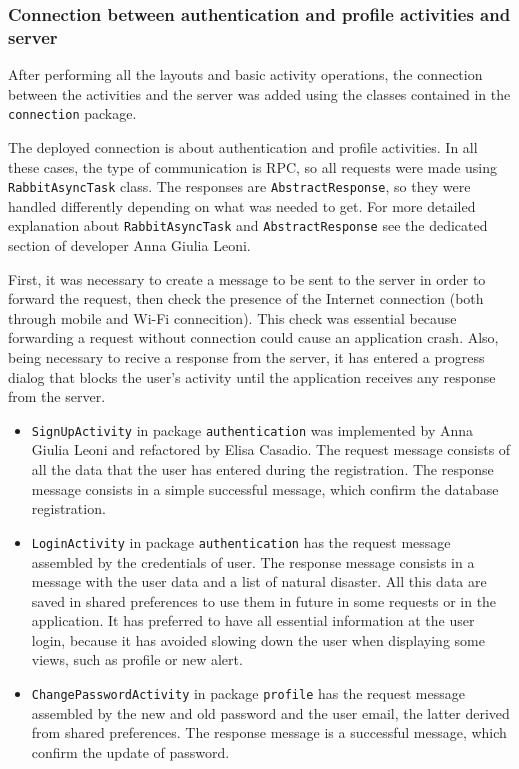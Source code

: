 \documentclass[a4paper,12pt]{report}
\begin{document}
\subsubsection{Connection between authentication and profile activities and server}
After performing all the layouts and basic activity operations, the connection between the activities and the server was added using the classes contained in the \texttt{connection} package.

The deployed connection is about authentication and profile activities. In all these cases, the type of communication is RPC, so all requests were made using \texttt{RabbitAsyncTask} class. The responses are \texttt{AbstractResponse}, so they were handled differently depending on what was needed to get. For more detailed explanation about \texttt{RabbitAsyncTask} and \texttt{AbstractResponse} see the dedicated section of developer Anna Giulia Leoni.

First, it was necessary to create a message to be sent to the server in order to forward the request, then check the presence of the Internet connection (both through mobile and Wi-Fi connecition). This check was essential because forwarding a request without connection could cause an application crash. Also, being necessary to recive a response from the server, it has entered a progress dialog that blocks the user's activity until the application receives any response from the server.

\begin{itemize}
\item \texttt{SignUpActivity} in package \texttt{authentication} was implemented by Anna Giulia Leoni and refactored by Elisa Casadio. The request message consists of all the data that the user has entered during the registration. The response message consists in a simple successful message, which confirm the database registration.
\item \texttt{LoginActivity} in package \texttt{authentication} has the request message assembled by the credentials of user. The response message consists in a message with the user data and a list of natural disaster. All this data are saved in shared preferences to use them in future in some requests or in the application. It has preferred to have all essential information at the user login, because it has avoided slowing down the user when displaying some views, such as profile or new alert.
\item \texttt{ChangePasswordActivity} in package \texttt{profile} has the request message assembled by the new and old password and the user email, the latter derived from shared preferences. The response message is a successful message, which confirm the update of password.
\end{itemize}
\end{document}
